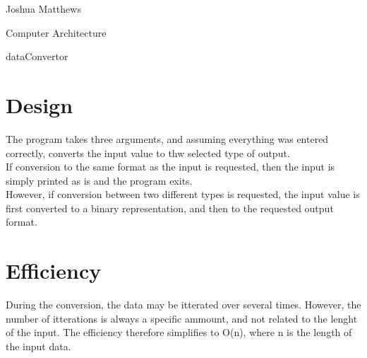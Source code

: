 \documentclass[letterpaper,12pt]{article}
\begin{document}
\noindent Joshua Matthews

\noindent Computer Architecture

\noindent dataConvertor

\section{Design}
The program takes three arguments, and assuming everything was entered correctly, converts the input value to thw selected type of output.\\
If conversion to the same format as the input is requested, then the input is simply printed as is and the program exits.\\
However, if conversion between two different types is requested, the input value is first converted to a binary representation, and then to the requested output format.

\section{Efficiency}
During the conversion, the data may be itterated over several times. However, the number of itterations is always a specific ammount,
and not related to the lenght of the input. The efficiency therefore simplifies to O(n), where n is the length of the input data.
\end{document}
